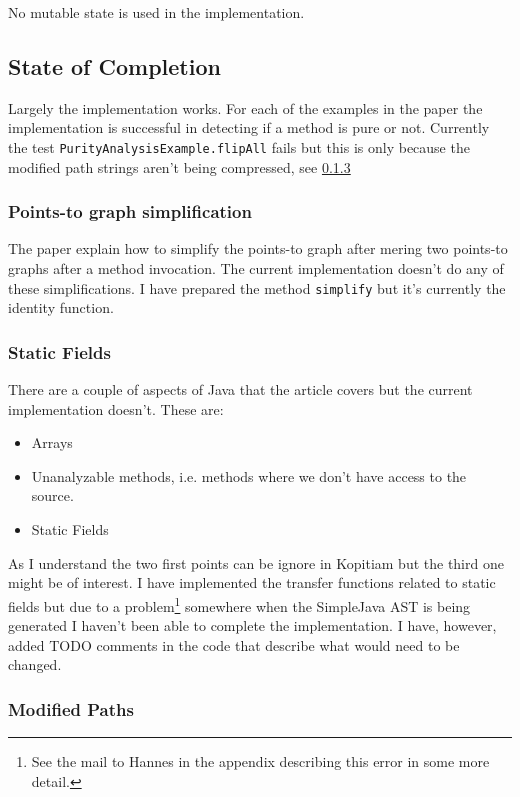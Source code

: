 \documentclass[11pt]{exam}
\begin{document}
No mutable state is used in the implementation.

\subsection{State of Completion}

Largely the implementation works. For each of the examples in the paper the implementation is successful in detecting if a method is pure or not. Currently the test \texttt{PurityAnalysisExample.flipAll} fails but this is only because the modified path strings aren't being compressed, see \ref{subsub:mp}

\subsubsection{Points-to graph simplification}

The paper explain how to simplify the points-to graph after mering two points-to graphs after a method invocation. The current implementation doesn't do any of these simplifications. I have prepared the method \texttt{simplify} but it's currently the identity function.

\subsubsection{Static Fields}

There are a couple of aspects of Java that the article covers but the current implementation doesn't. These are:

\begin{itemize}
  \setlength{\itemsep}{1pt}
  \setlength{\parskip}{0pt}
  \item Arrays
  \item Unanalyzable methods, i.e. methods where we don't have access to the source.
  \item Static Fields
\end{itemize}

As I understand the two first points can be ignore in Kopitiam but the third one might be of interest. I have implemented the transfer functions related to static fields but due to a problem\footnote{See the mail to Hannes in the appendix describing this error in some more detail.} somewhere when the SimpleJava AST is being generated I haven't been able to complete the implementation. I have, however, added TODO comments in the code that describe what would need to be changed.

\subsubsection{Modified Paths}
\label{subsub:mp}
\end{document}
